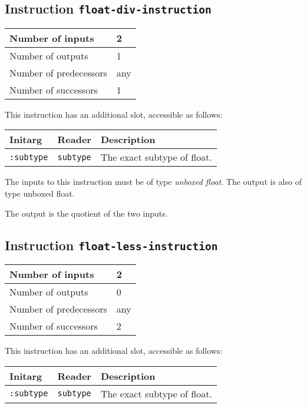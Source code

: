 \subsection{Instruction \texttt{float-div-instruction}}
\label{hir-instruction-float-div}

\begin{tabular}{|l|l|}
\hline
Number of inputs & 2\\
\hline
Number of outputs & 1\\
\hline
Number of predecessors & any\\
\hline
Number of successors & 1\\
\hline
\end{tabular}

This instruction has an additional slot, accessible as follows:

\begin{tabular}{|l|l|l|}
  \hline
  Initarg & Reader & Description\\
  \hline\hline
  \texttt{:subtype} & \texttt{subtype} & The exact subtype of float.\\
  \hline
\end{tabular}

The inputs to this instruction must be of type \emph{unboxed
  float}. The output is also of type unboxed float.

The output is the quotient of the two inputs.

\subsection{Instruction \texttt{float-less-instruction}}
\label{hir-instruction-float-less}

\begin{tabular}{|l|l|}
\hline
Number of inputs & 2\\
\hline
Number of outputs & 0\\
\hline
Number of predecessors & any\\
\hline
Number of successors & 2\\
\hline
\end{tabular}

This instruction has an additional slot, accessible as follows:

\begin{tabular}{|l|l|l|}
  \hline
  Initarg & Reader & Description\\
  \hline\hline
  \texttt{:subtype} & \texttt{subtype} & The exact subtype of float.\\
  \hline
\end{tabular}

